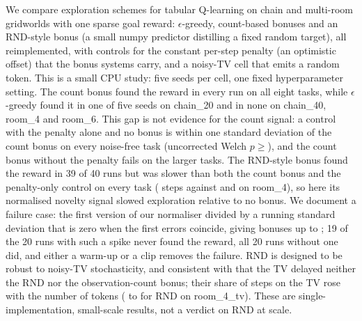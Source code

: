 We compare exploration schemes for tabular Q-learning on chain and multi-room gridworlds with one sparse goal reward: $\epsilon$-greedy, count-based bonuses and an RND-style bonus (a small numpy predictor distilling a fixed random target), all reimplemented, with controls for the constant per-step penalty (an optimistic offset) that the bonus systems carry, and a noisy-TV cell that emits a random token. This is a small CPU study: five seeds per cell, one fixed hyperparameter setting. The count bonus found the reward in every run on all eight tasks, while $\epsilon$-greedy found it in one of five seeds on chain\_20 and in none on chain\_40, room\_4 and room\_6. This gap is not evidence for the count signal: a control with the penalty alone and no bonus is within one standard deviation of the count bonus on every noise-free task (uncorrected Welch $p\geq{}$), and the count bonus without the penalty fails on the larger tasks. The RND-style bonus found the reward in 39 of 40 runs but was slower than both the count bonus and the penalty-only control on every task ( steps against  and  on room\_4), so here its normalised novelty signal slowed exploration relative to no bonus. We document a failure case: the first version of our normaliser divided by a running standard deviation that is zero when the first errors coincide, giving bonuses up to ; 19 of the 20 runs with such a spike never found the reward, all 20 runs without one did, and either a warm-up or a clip removes the failure. RND is designed to be robust to noisy-TV stochasticity, and consistent with that the TV delayed neither the RND nor the observation-count bonus; their share of steps on the TV rose with the number of tokens ( to  for RND on room\_4\_tv). These are single-implementation, small-scale results, not a verdict on RND at scale.
